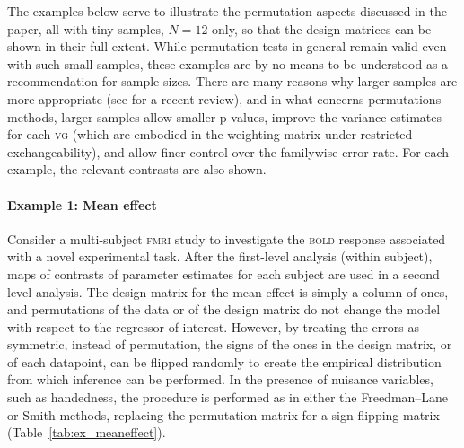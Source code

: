 The examples below serve to illustrate the permutation aspects discussed in the paper, all with tiny samples, $N=12$ only, so that the design matrices can be shown in their full extent. While permutation tests in general remain valid even with such small samples, these examples are by no means to be understood as a recommendation for sample sizes. There are many reasons why larger samples are more appropriate (see \citet{Button2013} for a recent review), and in what concerns permutations methods, larger samples allow smaller p-values, improve the variance estimates for each \textsc{vg} (which are embodied in the weighting matrix under restricted exchangeability), and allow finer control over the familywise error rate. For each example, the relevant contrasts are also shown.

\paragraph{Example 1: Mean effect} Consider a multi-subject \textsc{fmri} study to investigate the \textsc{bold} response associated with a novel experimental task. After the first-level analysis (within subject), maps of contrasts of parameter estimates for each subject are used in a second level analysis. The design matrix for the mean effect is simply a column of ones, and permutations of the data or of the design matrix do not change the model with respect to the regressor of interest. However, by treating the errors as symmetric, instead of permutation, the signs of the ones in the design matrix, or of each datapoint, can be flipped randomly to create the empirical distribution from which inference can be performed. In the presence of nuisance variables, such as handedness, the procedure is performed as in either the Freedman--Lane or Smith methods, replacing the permutation matrix for a sign flipping matrix (Table~\ref{tab:ex_meaneffect}).


